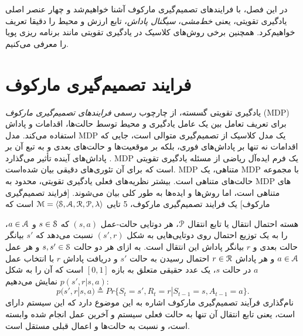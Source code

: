 
  در این فصل، با فرایندهای تصمیم‌گیری مارکوف آشنا خواهیم‌شد و چهار عنصر اصلی یادگیری تقویتی، یعنی \textit{خط‌مشی}، \textit{سیگنال پاداش}، تابع ارزش و محیط را دقیقا تعریف خواهیم‌کرد. همچنین برخی روش‌های کلاسیک در یادگیری تقویتی مانند برنامه ریزی پویا را معرفی می‌کنیم.



\section{فرایند تصمیم‌گیری مارکوف}

یادگیری تقویتی گسسته، از چارچوب رسمی \textit{فرایندهای تصمیم‌گیری مارکوف} 
 (MDP)
 برای تعریف تعامل بین یک عامل یادگیری و محیط توسط حالت‌ها، اقدامات و پاداش استفاده می‌کند. مدل MDP یک مدل کلاسیک از تصمیم‌گیری متوالی است، جایی که اقدامات نه تنها بر پاداش‌های فوری، بلکه بر موقعیت‌ها و حالت‌های بعدی و به تبع آن بر پاداش‌های آینده تأثیر می‌گذارد
 \cite{suttonbook}.
MDP
 یک فرم ایده‌آل ریاضی از مسئله یادگیری تقویتی است که برای آن تئوری‌های دقیقی بیان شده‌است.
MDP متناهی،
 یک MDP با مجموعه حالت‌های متناهی است. 
بیشتر نظریه‌های فعلی یادگیری تقویتی، محدود به MDP  های متناهی است، اما روش‌ها و ایده‌ها به طور کلی بیان می‌شوند.
[فرایند تصمیم‌گیری مارکوف] 
یک فرایند تصمیم‌گیری مارکوف، 5 تایی 
$\EuScript{M} = \left< \EuScript{S},\EuScript{A},\EuScript{R},\EuScript{P}, \lambda \right>$
است که

هسته احتمال انتقال یا تابع انتقال $\EuScript{P}$، هر دوتایی حالت-عمل
$(s,a)$ که 
$s \in \EuScript{S}$
و
$a \in \EuScript{A}$، را به یک توزیع احتمال روی دوتایی‌هایی به شکل 
$(s',r)$
نسبت می‌دهد که $s'$ بیانگر حالت بعدی و $r$ بیانگر پاداش این انتقال است. به ازای هر دو حالت 
$s,s' \in \EuScript{S}$
 و هر عمل 
 $a \in \EuScript{A}$
  و هر پاداش 
  $r \in \EuScript{R}$
  احتمال رسیدن به حالت $s'$ و دریافت پاداش $r$ با انتخاب عمل $a$ در حالت $s$، یک عدد حقیقی متعلق به  بازه $[0,1]$ است که آن را به شکل
$p(s',r|s,a)$
نمایش می‌دهیم:
$$p(s',r|s,a) \triangleq Pr\{S_t=s',R_t=r|S_{t-1}=s,A_{t-1}=a\}.$$ 
نام‌گذاری فرآیند تصمیم‌گیری مارکوف اشاره به این موضوع دارد که این سیستم‌ دارای   است، یعنی تابع انتقال آن تنها به حالت فعلی سیستم و آخرین عمل انجام شده وابسته است، و نسبت به حالت‌ها و اعمال قبلی مستقل است.

